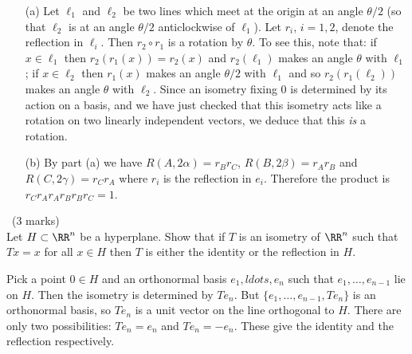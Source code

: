 \documentclass[12pt]{article}
\begin{document}
\begin{answer}
  \begin{enumerate}
  \item[(a)] Let $\ell_1$ and $\ell_2$ be two lines which meet at the origin at an angle $\theta/2$ (so that $\ell_2$ is at an angle $\theta/2$ anticlockwise of $\ell_1$). Let $r_i$, $i=1,2$, denote the reflection in $\ell_i$. Then $r_2\circ r_1$ is a rotation by $\theta$. To see this, note that: if $x\in \ell_1$ then $r_2(r_1(x))=r_2(x)$ and $r_2(\ell_1)$ makes an angle $\theta$ with $\ell_1$; if $x\in\ell_2$ then $r_1(x)$ makes an angle $\theta/2$ with $\ell_1$ and so $r_2(r_1(\ell_2))$ makes an angle $\theta$ with $\ell_2$. Since an isometry fixing 0 is determined by its action on a basis, and we have just checked that this isometry acts like a rotation on two linearly independent vectors, we deduce that this {\em is} a rotation.
  \item[(b)] By part (a) we have $R(A,2\alpha)=r_Br_C$, $R(B,2\beta)=r_Ar_B$ and $R(C,2\gamma)=r_Cr_A$ where $r_i$ is the reflection in $e_i$. Therefore the product is $r_Cr_Ar_Ar_Br_Br_C=1$.
  \end{enumerate}
\end{answer}
\newpage

\vspace{1cm}

\begin{question}\ (3 marks)\\
  Let $H\subset\RR^n$ be a hyperplane. Show that if $T$ is an isometry of $\RR^n$ such that $Tx=x$ for all $x\in H$ then $T$ is either the identity or the reflection in $H$.
\end{question}

\begin{answer}
Pick a point $0\in H$ and an orthonormal basis $e_1,ldots,e_n$ such that $e_1,\ldots,e_{n-1}$ lie on $H$. Then the isometry is determined by $Te_n$. But $\{e_1,\ldots,e_{n-1},Te_n\}$ is an orthonormal basis, so $Te_n$ is a unit vector on the line orthogonal to $H$. There are only two possibilities: $Te_n=e_n$ and $Te_n=-e_n$. These give the identity and the reflection respectively. 
\end{answer}
\newpage
\end{document}
